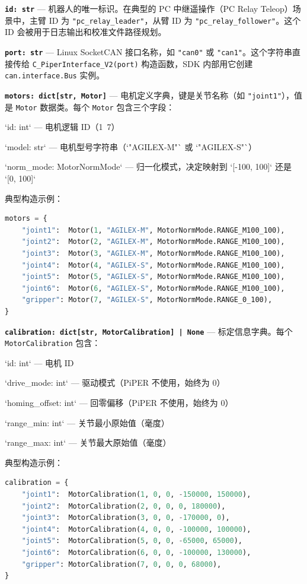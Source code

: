 \documentclass[UTF8,a4paper,11pt]{ctexart}
\begin{document}
\textbf{\texttt{id: str}} — 机器人的唯一标识。在典型的 PC 中继遥操作（PC Relay Teleop）场景中，主臂 ID 为 \texttt{"pc_relay_leader"}，从臂 ID 为 \texttt{"pc_relay_follower"}。这个 ID 会被用于日志输出和校准文件路径规划。

\textbf{\texttt{port: str}} — Linux SocketCAN 接口名称，如 \texttt{"can0"} 或 \texttt{"can1"}。这个字符串直接传给 \texttt{C_PiperInterface_V2(port)} 构造函数，SDK 内部用它创建 \texttt{can.interface.Bus} 实例。

\textbf{\texttt{motors: dict[str, Motor]}} — 电机定义字典，键是关节名称（如 \texttt{"joint1"}），值是 \texttt{Motor} 数据类。每个 \texttt{Motor} 包含三个字段：

\item `id: int` — 电机逻辑 ID（1~7）
\item `model: str` — 电机型号字符串（`"AGILEX-M"` 或 `"AGILEX-S"`）
\item `norm_mode: MotorNormMode` — 归一化模式，决定映射到 `[-100, 100]` 还是 `[0, 100]`

典型构造示例：
\begin{lstlisting}[language=python]
motors = {
    "joint1":  Motor(1, "AGILEX-M", MotorNormMode.RANGE_M100_100),
    "joint2":  Motor(2, "AGILEX-M", MotorNormMode.RANGE_M100_100),
    "joint3":  Motor(3, "AGILEX-M", MotorNormMode.RANGE_M100_100),
    "joint4":  Motor(4, "AGILEX-S", MotorNormMode.RANGE_M100_100),
    "joint5":  Motor(5, "AGILEX-S", MotorNormMode.RANGE_M100_100),
    "joint6":  Motor(6, "AGILEX-S", MotorNormMode.RANGE_M100_100),
    "gripper": Motor(7, "AGILEX-S", MotorNormMode.RANGE_0_100),
}
\end{lstlisting}

\textbf{\texttt{calibration: dict[str, MotorCalibration] | None}} — 标定信息字典。每个 \texttt{MotorCalibration} 包含：

\item `id: int` — 电机 ID
\item `drive_mode: int` — 驱动模式（PiPER 不使用，始终为 0）
\item `homing_offset: int` — 回零偏移（PiPER 不使用，始终为 0）
\item `range_min: int` — 关节最小原始值（毫度）
\item `range_max: int` — 关节最大原始值（毫度）

典型构造示例：
\begin{lstlisting}[language=python]
calibration = {
    "joint1":  MotorCalibration(1, 0, 0, -150000, 150000),
    "joint2":  MotorCalibration(2, 0, 0, 0, 180000),
    "joint3":  MotorCalibration(3, 0, 0, -170000, 0),
    "joint4":  MotorCalibration(4, 0, 0, -100000, 100000),
    "joint5":  MotorCalibration(5, 0, 0, -65000, 65000),
    "joint6":  MotorCalibration(6, 0, 0, -100000, 130000),
    "gripper": MotorCalibration(7, 0, 0, 0, 68000),
}
\end{lstlisting}
\end{document}
